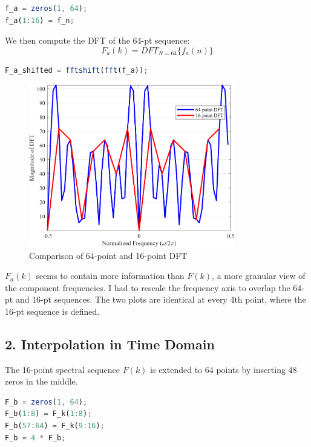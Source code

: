 \documentclass[12pt]{article}
\begin{document}
\begin{lstlisting}[language=Octave, caption=Zero-Padded Time Sequence]
f_a = zeros(1, 64);
f_a(1:16) = f_n;
\end{lstlisting}

\vspace{0.5 cm}
We then compute the DFT of the 64-pt sequence:
\[ F_a(k) = DFT_{N = 64} \{f_a(n)\} \]

\begin{lstlisting}[language=Octave, caption=DFT of 64-pt Sequence]
F_a_shifted = fftshift(fft(f_a));
\end{lstlisting}

\begin{figure}[H]
    \centering
    \includegraphics[width=0.8\textwidth]{F_a.png}
    \caption{Comparison of 64-point and 16-point DFT}
\end{figure}

$F_a(k)$ seems to contain more information than $F(k)$, a more granular view of the component frequencies. I had to rescale the frequency axis to overlap the 64-pt and 16-pt sequences. The two plots are identical at every 4th point, where the 16-pt sequence is defined.

\newpage
\subsection*{2. Interpolation in Time Domain}
The 16-point spectral sequence $F(k)$ is extended to 64 points by inserting 48 zeros in the middle. 

\begin{lstlisting}[language=Octave, caption=Zero-Padded Frequency Sequence]
F_b = zeros(1, 64);
F_b(1:8) = F_k(1:8);
F_b(57:64) = F_k(9:16);
F_b = 4 * F_b;
\end{lstlisting}
\end{document}
